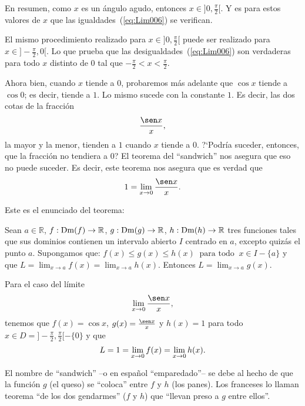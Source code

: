 En resumen, como $x$ es un ángulo agudo, entonces $x\in ]0,\frac{\pi}{2}[$. Y es para estos valores
de $x$ que las igualdades~(\ref{eq:Lim006}) se verifican.

El mismo procedimiento realizado para $x\in ]0,\frac{\pi}{2}[$ puede ser realizado para $x\in
]-\frac{\pi}{2}, 0[$. Lo que prueba que las desigualdades~(\ref{eq:Lim006}) son verdaderas para
todo $x$ distinto de $0$ tal que $-\frac{\pi}{2} < x < \frac{\pi}{2}$.

Ahora bien, cuando $x$ tiende a $0$, probaremos más adelante que $\cos x$ tiende a $\cos 0$; es
decir, tiende a $1$. Lo mismo sucede con la constante $1$. Es decir, las dos cotas de la fracción
\[
\frac{\sen x}{x},
\]
la mayor y la menor, tienden a $1$ cuando $x$ tiende a $0$. ?`Podría suceder, entonces, que la
fracción no tendiera a $0$? El teorema del ``sandwich'' nos asegura que eso no puede suceder. Es
decir, este teorema nos asegura que es verdad que
\[
1 = \limjc{\frac{\sen x}{x}}{x}{0}.
\]

Este es el enunciado del teorema:

\begin{teocal}
Sean $a\in\mathbb{R}$, $f:\Dm(f) \rightarrow \mathbb{R}$, $g:\Dm(g) \rightarrow \mathbb{R} $,
$h:\Dm(h) \rightarrow \mathbb{R}$ tres funciones tales que sus dominios contienen un intervalo
abierto $I$ centrado en $a$, excepto quizás el punto $a$.
Supongamos que:
$
	f(x)\leq g(x)\leq h(x) \ \text{ para todo }\ x\in I - \{a\}
$
y que
$\displaystyle
	L = \lim_{x \rightarrow a}f(x)= \lim_{x \rightarrow a}h(x)
$.
Entonces
$\displaystyle
	L = \lim_{x \rightarrow a}g(x).
$
\end{teocal}

Para el caso del límite
\[
\limjc{\frac{\sen x}{x}}{x}{0},
\]
tenemos que $f(x) = \cos x$, $g(x) = \frac{\sen x}{x}$ y $h(x) = 1$ para todo $x \in D =
]-\frac{\pi}{2},\frac{\pi}{2}[ - \{0\}$ y que
\[
L = 1 = \limjc{f(x)}{x}{0} = \limjc{h(x)}{x}{0}.
\]

El nombre de ``sandwich'' --o en español ``emparedado''-- se debe al hecho de que la función $g$
(el queso) se ``coloca'' entre $f$ y $h$ (los panes). Los franceses lo llaman teorema ``de los dos
gendarmes'' ($f$ y $h$) que ``llevan preso a $g$ entre ellos''.

